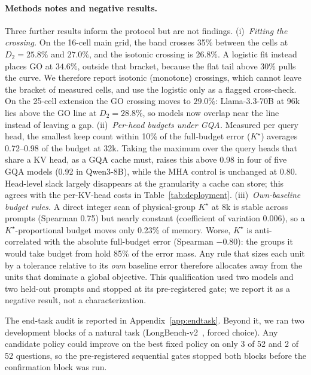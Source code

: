 \paragraph{Methods notes and negative results.}
Three further results inform the protocol but are not findings.
(i)~\emph{Fitting the crossing.}  On the 16-cell main grid, the band crosses
35\% between the cells at $D_2=25.8\%$ and $27.0\%$, and the isotonic crossing is
$26.8\%$.  A logistic fit instead places GO at $34.6\%$, outside that bracket,
because the flat tail above 30\% pulls the curve.  We therefore report isotonic
(monotone) crossings, which cannot leave the bracket of measured cells, and use
the logistic only as a flagged cross-check.  On the 25-cell extension the GO
crossing moves to $29.0\%$: Llama-3.3-70B at 96k lies above the GO line at
$D_2=28.8\%$, so models now overlap near the line instead of leaving a gap.
(ii)~\emph{Per-head budgets under GQA.}  Measured per query head, the smallest
keep count within 10\% of the full-budget error ($K^\star$) averages 0.72--0.98
of the budget at 32k.  Taking the maximum over the query heads that share a KV
head, as a GQA cache must, raises this above 0.98 in four of five GQA models
(0.92 in Qwen3-8B), while the MHA control is unchanged at 0.80.  Head-level slack
largely disappears at the granularity a cache can store; this agrees with the
per-KV-head costs in Table~\ref{tab:deployment}.
(iii)~\emph{Own-baseline budget rules.}  A direct integer scan of physical-group
$K^\star$ at 8k is stable across prompts (Spearman 0.75) but nearly constant
(coefficient of variation 0.006), so a $K^\star$-proportional budget moves only
0.23\% of memory.  Worse, $K^\star$ is anti-correlated with the absolute
full-budget error (Spearman $-0.80$): the groups it would take budget from hold
85\% of the error mass.  Any rule that sizes each unit by a tolerance relative
to its \emph{own} baseline error therefore allocates away from the units that
dominate a global objective.  This qualification used two models and two
held-out prompts and stopped at its pre-registered gate; we report it as a
negative result, not a characterization.

The end-task audit is reported in Appendix~\ref{app:endtask}.  Beyond it, we
ran two development blocks of a natural task (LongBench-v2~\citep{bai2025longbenchv2},
forced choice).  Any candidate policy could improve on the best fixed policy on
only 3 of 52 and 2 of 52 questions, so the pre-registered sequential gates
stopped both blocks before the confirmation block was run.


